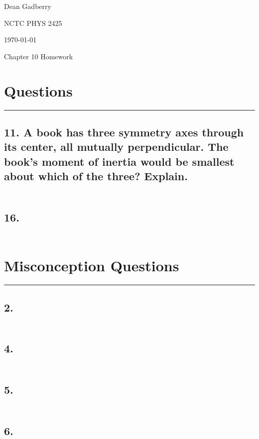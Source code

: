 \documentclass[12pt,a4paper,english]{article}
\begin{document}
\begin{flushright}
  Dean Gadberry

  NCTC PHYS 2425

  \today
\end{flushright}
\begin{center}
  {\large Chapter 10 Homework}
\end{center}
\begin{flushleft}

  \section*{Questions}
  \hrule
  \subsection{11. A book has three symmetry axes through its center, all mutually perpendicular. The book's moment of inertia would be smallest about which of the three? Explain. }
  \begin{align*}
  \end{align*}
  \subsection{16. }
  \begin{align*}
  \end{align*}

  \section*{Misconception Questions}
  \hrule
  \subsection{2. }
  \begin{align*}
  \end{align*}
  \subsection{4. }
  \begin{align*}
  \end{align*}
  \subsection{5. }
  \begin{align*}
  \end{align*}
  \subsection{6. }
  \begin{align*}
  \end{align*}

\end{flushleft}
\end{document}
